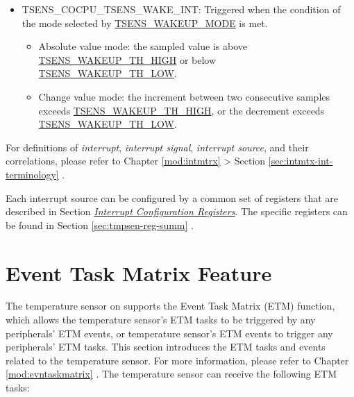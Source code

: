 \documentclass[main\_\_EN.tex]{subfiles}
\begin{document}
\begin{itemize}
    \item \label{interrupt:TSENSCOCPUTSENSWAKEINT} TSENS\_COCPU\_TSENS\_WAKE\_INT: Triggered when the condition of the mode selected by \hyperref[fielddesc:TSENSWAKEUPMODE]{TSENS\_WAKEUP\_MODE} is met.
    \begin{itemize}
        \item Absolute value mode: the sampled value is above \hyperref[fielddesc:TSENSWAKEUPTHHIGH]{TSENS\_WAKEUP\_TH\_HIGH} or below \hyperref[fielddesc:TSENSWAKEUPTHLOW]{TSENS\_WAKEUP\_TH\_LOW}.
        \item Change value mode: the increment between two consecutive samples exceeds \hyperref[fielddesc:TSENSWAKEUPTHHIGH]{TSENS\_WAKEUP\_TH\_HIGH}, or the decrement exceeds \hyperref[fielddesc:TSENSWAKEUPTHLOW]{TSENS\_WAKEUP\_TH\_LOW}.
    \end{itemize}
\end{itemize}

\begin{tiplisting}
For definitions of \textit{interrupt}, \textit{interrupt signal}, \textit{interrupt source}, and their correlations, please refer to Chapter \ref{mod:intmtrx} \textit{} > Section \ref{sec:intmtx-int-terminology} \textit{}.
\end{tiplisting}

Each interrupt source can be configured by a common set of registers that are described in Section \hyperref[interrupt-config-registers]{\textit{Interrupt Configuration Registers}}. The specific registers can be found in Section \ref{sec:tmpsen-reg-summ} \textit{}.


\section{Event Task Matrix Feature}
\label{sec:tmpsen-etm-func}

The temperature sensor on \chipname{} supports the Event Task Matrix (ETM) function, which allows the temperature sensor's ETM tasks to be triggered by any peripherals' ETM events, or temperature sensor's ETM events to trigger any peripherals' ETM tasks. This section introduces the ETM tasks and events related to the temperature sensor. For more information, please refer to Chapter \ref{mod:evntaskmatrix} \textit{}.
The temperature sensor can receive the following ETM tasks:
\end{document}

